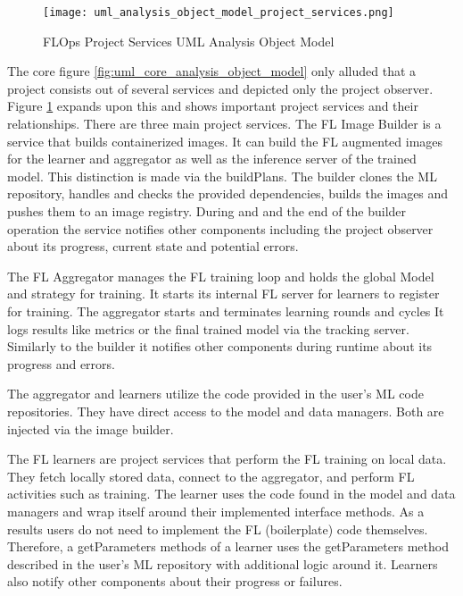 \begin{figure}[h]
    \centering
    \texttt{[image: uml\_analysis\_object\_model\_project\_services.png]}
    \caption{FLOps Project Services UML Analysis Object Model}
    \label{fig:uml_project_services_analysis_object_model}
\end{figure}

The core figure \ref{fig:uml_core_analysis_object_model} only alluded that a project consists out of several services and depicted only the project observer.
Figure \ref{fig:uml_project_services_analysis_object_model} expands upon this and shows important project services and their relationships.
There are three main project services.
The FL Image Builder is a service that builds containerized images.
It can build the FL augmented images for the learner and aggregator as well as the inference server of the trained model.
This distinction is made via the buildPlans.
The builder clones the ML repository, handles and checks the provided dependencies, builds the images and pushes them to an image registry.
During and and the end of the builder operation the service notifies other components including the project observer about its progress, current state and potential errors.

The FL Aggregator manages the FL training loop and holds the global Model and strategy for training.
It starts its internal FL server for learners to register for training.
The aggregator starts and terminates learning rounds and cycles
It logs results like metrics or the final trained model via the tracking server.
Similarly to the builder it notifies other components during runtime about its progress and errors.

The aggregator and learners utilize the code provided in the user's ML code repositories.
They have direct access to the model and data managers.
Both are injected via the image builder.

The FL learners are project services that perform the FL training on local data.
They fetch locally stored data, connect to the aggregator, and perform FL activities such as training.
The learner uses the code found in the model and data managers and wrap itself around their implemented interface methods.
As a results users do not need to implement the FL (boilerplate) code themselves.
Therefore, a getParameters methods of a learner uses the getParameters method described in the user's ML repository with additional logic around it.
Learners also notify other components about their progress or failures.

